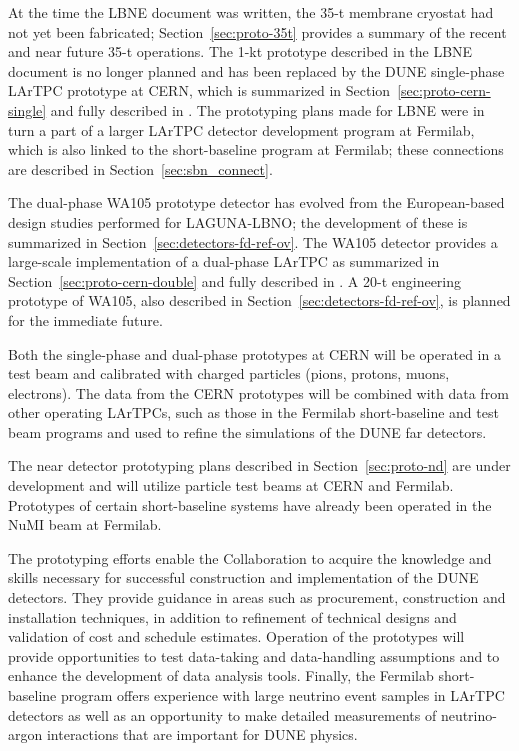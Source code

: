 At the time the LBNE document was written, the 35-t membrane cryostat
had not yet been fabricated; Section~\ref{sec:proto-35t} provides a
summary of the recent and near future 35-t operations.  The 1-kt
prototype described in the LBNE document is no longer planned and has
been replaced by the DUNE single-phase LArTPC prototype at CERN, which
is summarized in Section~\ref{sec:proto-cern-single} and fully
described in \anxcernproto.  The prototyping plans made for LBNE were
in turn a part of a larger LArTPC detector development program at
Fermilab, which is also linked to the short-baseline program at
Fermilab; these connections are described in
Section~\ref{sec:sbn_connect}.

The dual-phase WA105 prototype detector has evolved from the
European-based design studies performed for LAGUNA-LBNO; the
development of these is summarized in
Section~\ref{sec:detectors-fd-ref-ov}.  The WA105 detector provides a
large-scale implementation of a dual-phase LArTPC as summarized 
in Section~\ref{sec:proto-cern-double} and fully described in
\anxdualtdr.  A 20-t engineering prototype of WA105, also described in
Section~\ref{sec:detectors-fd-ref-ov}, is planned for the immediate
future.

Both the single-phase and dual-phase prototypes at CERN will be
operated in a test beam and calibrated with charged particles (pions,
protons, muons, electrons). The data from the CERN prototypes will be
combined with data from other operating LArTPCs, such as those in the
Fermilab short-baseline and test beam programs and used to refine the
simulations of the DUNE far detectors.

The near detector prototyping plans described in
Section~\ref{sec:proto-nd} are under development and will
utilize particle test beams at CERN and Fermilab.  Prototypes
of certain short-baseline systems have already been operated in the
NuMI beam at Fermilab.

The prototyping efforts enable the Collaboration
to acquire the knowledge and skills necessary for successful
construction and implementation of the DUNE detectors. They provide
guidance in areas such as procurement, construction and installation
techniques, in addition to refinement of technical designs and validation of
cost and schedule estimates.  Operation of the prototypes will provide
opportunities to test data-taking and data-handling assumptions and
to enhance the development of data analysis tools.  Finally, the
Fermilab short-baseline program offers experience with large neutrino
event samples in LArTPC detectors as well as an opportunity to make
detailed measurements of neutrino-argon interactions that are
important for DUNE physics. 

